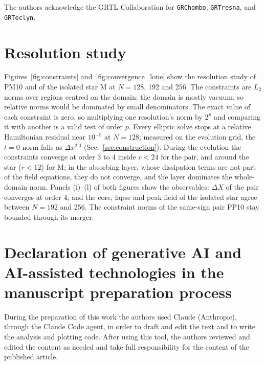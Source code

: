 \documentclass[twocolumn,floatfix,aps,prd,superscriptaddress,nofootinbib]{revtex4-2}
\begin{document}
\begin{acknowledgments}
The authors acknowledge the GRTL Collaboration for \texttt{GRChombo}, \texttt{GRTresna},
and \texttt{GRTeclyn}.
\end{acknowledgments}

\appendix

\section{Resolution study}
\label{app:constraints}

Figures~\ref{fig:constraints} and~\ref{fig:convergence_lone} show the resolution study of PM10 and of the isolated star M at $N=128$, 192 and 256. The constraints are $L_2$ norms over regions centred on the domain: the domain is mostly vacuum, so relative norms would be dominated by small denominators. The exact value of each constraint is zero, so multiplying one resolution's norm by $2^p$ and comparing it with another is a valid test of order $p$. Every elliptic solve stops at a relative Hamiltonian residual near $10^{-5}$ at $N=128$; measured on the evolution grid, the $t=0$ norm falls as $\Delta x^{2.0}$ (Sec.~\ref{sec:construction}). During the evolution the constraints converge at order 3 to 4 inside $r<24$ for the pair, and around the star ($r<12$) for M; in the absorbing layer, whose dissipation terms are not part of the field equations, they do not converge, and the layer dominates the whole-domain norm. Panels (i)--(l) of both figures show the observables: $\Delta X$ of the pair converges at order 4, and the core, lapse and peak field of the isolated star agree between $N=192$ and 256. The constraint norms of the same-sign pair PP10 stay bounded through its merger.


\FloatBarrier

\section*{Declaration of generative AI and AI-assisted technologies in the manuscript preparation process}
During the preparation of this work the authors used Claude (Anthropic), through the Claude Code agent, in order to draft and edit the text and to write the analysis and plotting code. After using this tool, the authors reviewed and edited the content as needed and take full responsibility for the content of the published article.
\end{document}
